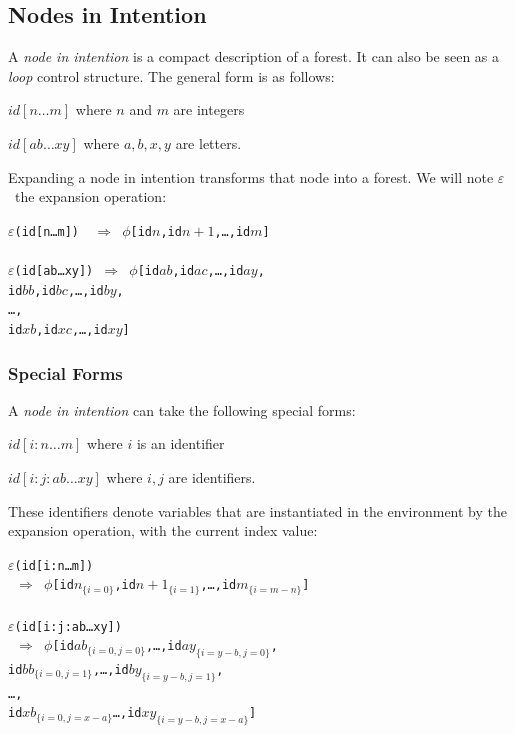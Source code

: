 \documentclass{article}
\newcommand{\code}	[2][0.9]		{\vspace{0mm}\begin{center}\colorbox{mygrey}{
							\begin{minipage}[t]{#1\columnwidth} 
							{\small \texttt{#2}}
							\end{minipage}}\end{center}}
\newcommand{\foret}		{\ensuremath{\phi}}
\newcommand{\nexpand}	{\ensuremath{\varepsilon}}
\newcommand{\ulc}		{\hspace*{37mm}}
\newcommand{\uld}		{\hspace*{9mm}}
\begin{document}
\subsection{Nodes in Intention}

A \emph{node in intention} is a compact description of a forest. It can also be seen as a \emph{loop} control structure. The general form is as follows:
\begin{description}
 \setlength\itemsep{0.0em}
\item $id[n…m]$ 	where $n$ and $m$ are integers
\item $id[ab…xy]$ where $a,b,x,y$ are letters.
\end{description}

Expanding a node in intention transforms that node into a forest. We will note \nexpand\ the expansion operation:
\code{\nexpand(id[n…m]) \ $\Rightarrow$ \foret [id$n$,id$n+1$,…,id$m$]\\
\\
\nexpand(id[ab…xy]) $\Rightarrow$ \foret [id$ab$,id$ac$,…,id$ay$,\\
\ulc id$bb$,id$bc$,…,id$by$,\\
\ulc …,\\
\ulc id$xb$,id$xc$,…,id$xy$]
}

\subsubsection{Special Forms}

A \emph{node in intention} can take the following special forms: 
\begin{description}
\item $id[i:n…m]$ 	where $i$ is an identifier
\item $id[i:j:ab…xy]$ where $i,j$ are identifiers.
\end{description}
These identifiers denote variables that are instantiated in the environment by the expansion operation, with the current index value:
\code{\nexpand(id[i:n…m]) \\
\ $\Rightarrow$ \foret [id$n_{\{i=0\}}$,id$n+1_{\{i=1\}}$,…,id$m_{\{i=m-n\}}$]\\
\\
\nexpand(id[i:j:ab…xy]) \\
\ $\Rightarrow$ \foret [id$ab_{\{i=0,j=0\}}$,…,id$ay_{\{i=y-b,j=0\}}$,\\
\uld id$bb_{\{i=0,j=1\}}$,…,id$by_{\{i=y-b,j=1\}}$,\\
\uld …,\\
\uld id$xb_{\{i=0,j=x-a\}}$…,id$xy_{\{i=y-b,j=x-a\}}$]
}
\end{document}
